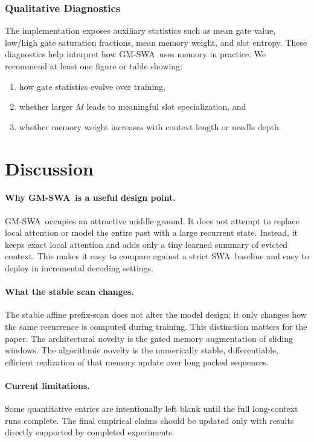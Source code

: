 \documentclass{article}
\newcommand{\model}{GM-SWA}
\newcommand{\baseline}{SWA}
\begin{document}
\subsubsection{Qualitative Diagnostics}

The implementation exposes auxiliary statistics such as mean gate value, low/high gate saturation fractions, mean memory weight, and slot entropy. These diagnostics help interpret how \model\ uses memory in practice. We recommend at least one figure or table showing:
\begin{enumerate}
    \item how gate statistics evolve over training,
    \item whether larger $M$ leads to meaningful slot specialization, and
    \item whether memory weight increases with context length or needle depth.
\end{enumerate}

\section{Discussion}

\paragraph{Why \model\ is a useful design point.}
\model\ occupies an attractive middle ground. It does not attempt to replace local attention or model the entire past with a large recurrent state. Instead, it keeps exact local attention and adds only a tiny learned summary of evicted context. This makes it easy to compare against a strict \baseline\ baseline and easy to deploy in incremental decoding settings.

\paragraph{What the stable scan changes.}
The stable affine prefix-scan does not alter the model design; it only changes how the same recurrence is computed during training. This distinction matters for the paper. The architectural novelty is the gated memory augmentation of sliding windows. The algorithmic novelty is the numerically stable, differentiable, efficient realization of that memory update over long packed sequences.

\paragraph{Current limitations.}
Some quantitative entries are intentionally left blank until the full long-context runs complete. The final empirical claims should be updated only with results directly supported by completed experiments.
\end{document}
